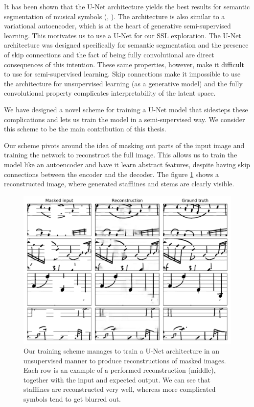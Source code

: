 It has been shown that the U-Net architecture yields the best results for semantic segmentation of musical symbols (\cite{UNet}, \cite{PachaBaseline}). The architecture is also similar to a variational autoencoder, which is at the heart of generative semi-supervised learning. This motivates us to use a U-Net for our SSL exploration. The U-Net architecture was designed specifically for semantic segmentation and the presence of skip connections and the fact of being fully convolutional are direct consequences of this intention. These same properties, however, make it difficult to use for semi-supervised learning. Skip connections make it impossible to use the architecture for unsupervised learning (as a generative model) and the fully convolutional property complicates interpretability of the latent space.

We have designed a novel scheme for training a U-Net model that sidesteps these complications and lets us train the model in a semi-supervised way. We consider this scheme to be the main contribution of this thesis.

Our scheme pivots around the idea of masking out parts of the input image and training the network to reconstruct the full image. This allows us to train the model like an autoencoder and have it learn abstract features, despite having skip connections between the encoder and the decoder. The figure \ref{fig:Reconstructions} shows a reconstructed image, where generated stafflines and stems are clearly visible.

\begin{figure}[ht]
    \centering
    \includegraphics[width=140mm]{../../figures/06-noise/reconstructions.pdf}
    \caption{Our training scheme manages to train a U-Net architecture in an unsupervised manner to produce reconstructions of masked images. Each row is an example of a performed reconstruction (middle), together with the input and expected output. We can see that stafflines are reconstructed very well, whereas more complicated symbols tend to get blurred out.}
    \label{fig:Reconstructions}
\end{figure}

